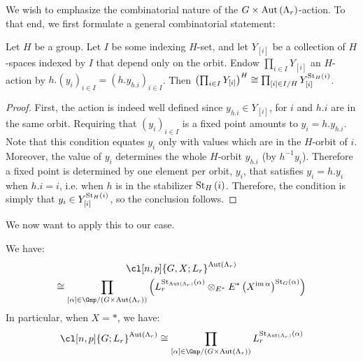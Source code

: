 We wish to emphasize the combinatorial nature of the $G \times \operatorname{Aut} \left(\Lambda_r\right)$-action.
To that end, we first formulate a general combinatorial statement:

\begin{proposition}\label{combinatorial-situation}
	Let $H$ be a group.
	Let $I$ be some indexing $H$-set, and let $Y_{\left[i\right]}$ be a collection of $H$-spaces indexed by $I$ that depend only on the orbit.
	Endow $\prod_{i \in I} Y_{\left[i\right]}$ an $H$-action by
	$
	h.\left(y_i\right)_{i \in I}
	= \left(h.y_{h.i}\right)_{i \in I}
	$.
	Then
	$
	\left(\prod_{i \in I} Y_{\left[i\right]}\right)^H
	\cong \prod_{\left[i\right] \in I/H} Y_{\left[i\right]}^{\operatorname{St}_H\left(i\right)}
	$.
\end{proposition}

\begin{proof}
	First, the action is indeed well defined since $y_{h.i} \in Y_{\left[i\right]}$, for $i$ and $h.i$ are in the same orbit.
	Requiring that $\left(y_i\right)_{i \in I}$ is a fixed point amounts to $y_i = h.y_{h.i}$.
	Note that this condition equates $y_i$ only with values which are in the $H$-orbit of $i$.
	Moreover, the value of $y_i$ determines the whole $H$-orbit $y_{h.i}$ (by $h^{-1} y_i$).
	Therefore a fixed point is determined by one element per orbit, $y_i$, that satisfies $y_i = h. y_i$ when $h.i = i$, i.e. when $h$ is in the stabilizer $\operatorname{St}_H\left(i\right)$.
	Therefore, the condition is simply that $y_i \in Y_{\left[i\right]}^{\operatorname{St}_H\left(i\right)}$, so the conclusion follows.
\end{proof}

We now want to apply this to our case.

\begin{proposition}\label{combinatorial-cl-fixed}
	We have:
	\begin{multline*}
		\cl[n,p]{G,X; L_r}^{\aut \left(\Lambda_r\right)}\\
		\cong \prod_{\left[\alpha\right] \in \Gnp/{\left(G \times \aut \left(\Lambda_r\right)\right)}}
		\left(
		L_r^{\stab_{\aut \left(\Lambda_r\right)}\left(\alpha\right)}
		\otimes_{E^*} E^*\left(X^{\im \alpha}\right)^{\stab_G\left(\alpha\right)}
		\right)
	\end{multline*}
	In particular, when $X = *$, we have:
	$$
	\cl[n,p]{G; L_r}^{\aut \left(\Lambda_r\right)}
	\cong \prod_{\left[\alpha\right] \in \Gnp/{\left(G \times \aut \left(\Lambda_r\right)\right)}}
	L_r^{\stab_{\aut \left(\Lambda_r\right)}\left(\alpha\right)}
	$$
\end{proposition}

